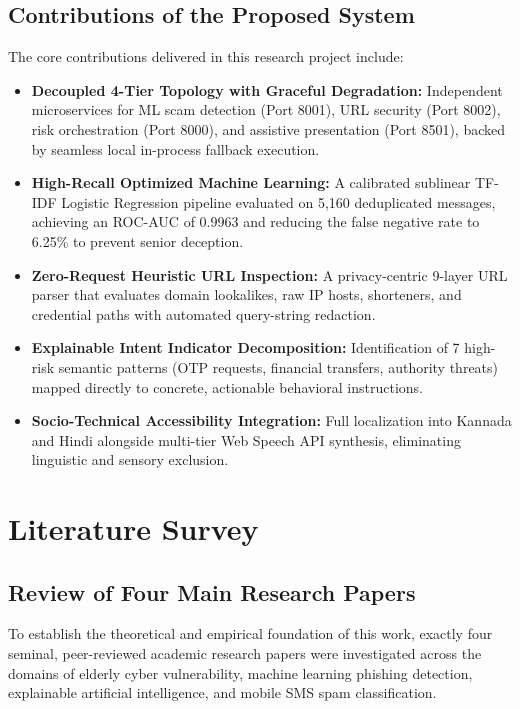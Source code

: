 \documentclass[conference]{IEEEtran}
\begin{document}
\subsection{Contributions of the Proposed System}
The core contributions delivered in this research project include:
\begin{itemize}
    \item \textbf{Decoupled 4-Tier Topology with Graceful Degradation:} Independent microservices for ML scam detection (Port 8001), URL security (Port 8002), risk orchestration (Port 8000), and assistive presentation (Port 8501), backed by seamless local in-process fallback execution.
    \item \textbf{High-Recall Optimized Machine Learning:} A calibrated sublinear TF-IDF Logistic Regression pipeline evaluated on 5,160 deduplicated messages, achieving an ROC-AUC of 0.9963 and reducing the false negative rate to 6.25\% to prevent senior deception.
    \item \textbf{Zero-Request Heuristic URL Inspection:} A privacy-centric 9-layer URL parser that evaluates domain lookalikes, raw IP hosts, shorteners, and credential paths with automated query-string redaction.
    \item \textbf{Explainable Intent Indicator Decomposition:} Identification of 7 high-risk semantic patterns (OTP requests, financial transfers, authority threats) mapped directly to concrete, actionable behavioral instructions.
    \item \textbf{Socio-Technical Accessibility Integration:} Full localization into Kannada and Hindi alongside multi-tier Web Speech API synthesis, eliminating linguistic and sensory exclusion.
\end{itemize}

\section{Literature Survey}

\subsection{Review of Four Main Research Papers}
To establish the theoretical and empirical foundation of this work, exactly four seminal, peer-reviewed academic research papers were investigated across the domains of elderly cyber vulnerability, machine learning phishing detection, explainable artificial intelligence, and mobile SMS spam classification.
\end{document}
